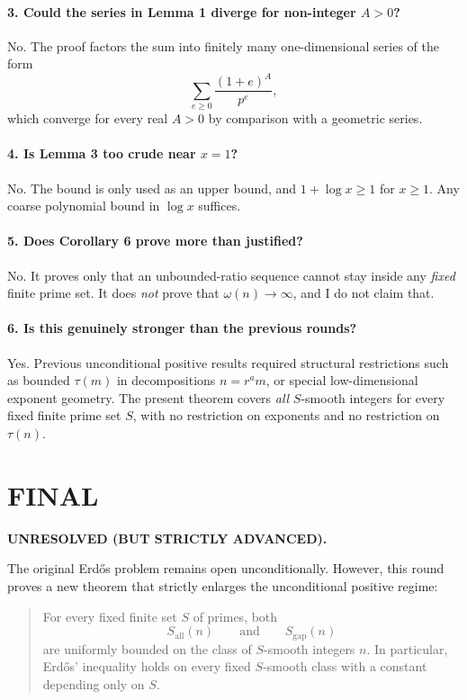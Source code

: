 \paragraph{3. Could the series in Lemma 1 diverge for non-integer \(A>0\)?}
No. The proof factors the sum into finitely many one-dimensional series of the form
\[
\sum_{e\ge 0}\frac{(1+e)^A}{p^e},
\]
which converge for every real \(A>0\) by comparison with a geometric series.

\paragraph{4. Is Lemma 3 too crude near \(x=1\)?}
No. The bound is only used as an upper bound, and \(1+\log x\ge 1\) for \(x\ge 1\). Any coarse polynomial bound in \(\log x\) suffices.

\paragraph{5. Does Corollary 6 prove more than justified?}
No. It proves only that an unbounded-ratio sequence cannot stay inside any \emph{fixed} finite prime set. It does \emph{not} prove that \(\omega(n)\to\infty\), and I do not claim that.

\paragraph{6. Is this genuinely stronger than the previous rounds?}
Yes. Previous unconditional positive results required structural restrictions such as bounded \(\tau(m)\) in decompositions \(n=r^a m\), or special low-dimensional exponent geometry. The present theorem covers \emph{all} \(S\)-smooth integers for every fixed finite prime set \(S\), with no restriction on exponents and no restriction on \(\tau(n)\).

\section{FINAL}

\textbf{UNRESOLVED (BUT STRICTLY ADVANCED).}

The original Erd\H{o}s problem remains open unconditionally. However, this round proves a new theorem that strictly enlarges the unconditional positive regime:

\begin{quote}
For every fixed finite set \(S\) of primes, both
\[
S_{\mathrm{all}}(n)
\qquad\text{and}\qquad
S_{\mathrm{gap}}(n)
\]
are uniformly bounded on the class of \(S\)-smooth integers \(n\). In particular, Erd\H{o}s' inequality holds on every fixed \(S\)-smooth class with a constant depending only on \(S\).
\end{quote}

